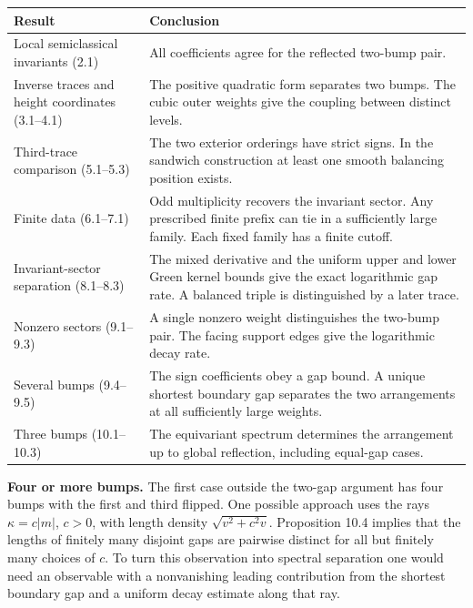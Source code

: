 \documentclass[11pt,letterpaper]{article}
\begin{document}
{%
\begin{longtable}[]{@{}
  >{\raggedright\arraybackslash}p{}
  >{\raggedright\arraybackslash}p{}@{}}
\toprule\noalign{}
\begin{minipage}[b]{\linewidth}\raggedright
Result
\end{minipage} & \begin{minipage}[b]{\linewidth}\raggedright
Conclusion
\end{minipage} \\
\midrule\noalign{}
\endhead
\bottomrule\noalign{}
\endlastfoot
Local semiclassical invariants (2.1) & All coefficients agree for the reflected two-bump
pair. \\
Inverse traces and height coordinates (3.1--4.1) & The positive quadratic form separates two
bumps. The cubic outer weights give the coupling between distinct levels. \\
Third-trace comparison (5.1--5.3) & The two exterior orderings have strict signs. In the
sandwich construction at least one smooth balancing position exists. \\
Finite data (6.1--7.1) & Odd multiplicity recovers the invariant sector. Any prescribed
finite prefix can tie in a sufficiently large family. Each fixed family has a finite
cutoff. \\
Invariant-sector separation (8.1--8.3) & The mixed derivative and the uniform upper and
lower Green kernel bounds give the exact logarithmic gap rate. A balanced triple is
distinguished by a later trace. \\
Nonzero sectors (9.1--9.3) & A single nonzero weight distinguishes the two-bump pair. The
facing support edges give the logarithmic decay rate. \\
Several bumps (9.4--9.5) & The sign coefficients obey a gap bound. A unique shortest
boundary gap separates the two arrangements at all sufficiently large weights. \\
Three bumps (10.1--10.3) & The equivariant spectrum determines the arrangement up to global
reflection, including equal-gap cases. \\
\end{longtable}
}

\textbf{Four or more bumps.} The first case outside the two-gap argument has four bumps with
the first and third flipped. One possible approach uses the rays \(\kappa=c|m|\), \(c>0\),
with length density \(\sqrt{v^2+c^2v}\). Proposition 10.4 implies that the lengths of
finitely many disjoint gaps are pairwise distinct for all but finitely many choices of
\(c\). To turn this observation into spectral separation one would need an observable with a
nonvanishing leading contribution from the shortest boundary gap and a uniform decay
estimate along that ray.
\end{document}
